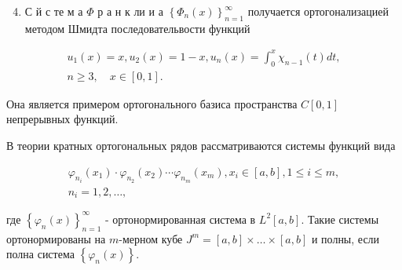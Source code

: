 \documentclass[10pt]{article}
\begin{document}
\begin{enumerate}

  \setcounter{enumi}{3}

  \item С й с те м а $\Phi$ р а н к ли и а $\left\{\Phi_{n}(x)\right\}_{n=1}^{\infty}$ получается ортогонализацией методом Шмидта последовательвости функций

\end{enumerate}



\[

\begin{gathered}

u_{1}(x)=x, u_{2}(x)=1-x, u_{n}(x)=\int_{0}^{x} \chi_{n-1}(t) d t, \\

n \geqslant 3, \quad x \in[0,1] .

\end{gathered}

\]



Она является примером ортогонального базиса пространства $C[0,1]$ непрерывных функций.



В теории кратных ортогональных рядов рассматриваются системы функций вида



\[

\begin{gathered}

\varphi_{n_{i}}\left(x_{1}\right) \cdot \varphi_{n_{2}}\left(x_{2}\right) \cdots \varphi_{n_{m}}\left(x_{m}\right), x_{i} \in[a, b], 1 \leqslant i \leqslant m, \\

n_{i}=1,2, \ldots,

\end{gathered}

\]



где $\left\{\varphi_{n}(x)\right\}_{n=1}^{\infty}$ - ортонормированная система в $L^{2}[a, b]$. Такие системы ортонормированы на $m$-мерном кубе $J^{m}=[a, b] \times \ldots \times[a, b]$ и полны, если полна система $\left\{\varphi_{n}(x)\right\}$.
\end{document}
